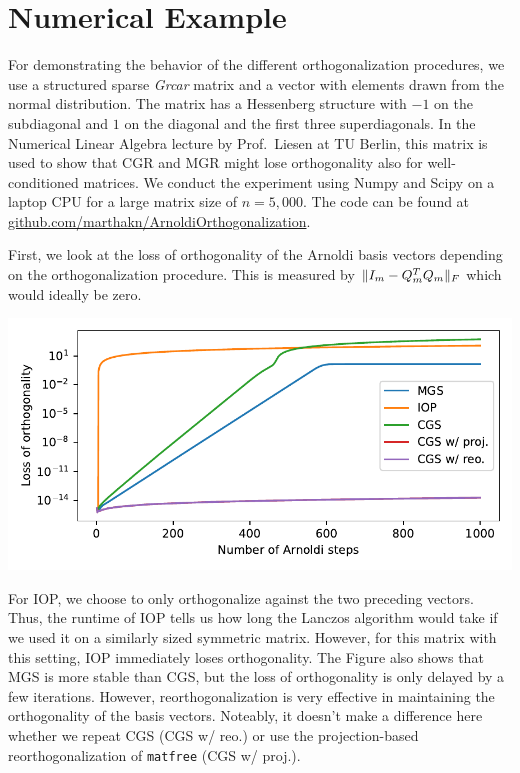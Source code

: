\documentclass[11pt]{article}
\DeclarePairedDelimiter\norm{\lVert}{\rVert}
\begin{document}
\section{Numerical Example}
For demonstrating the behavior of the different orthogonalization procedures, we use a structured sparse \emph{Grcar} matrix and a vector with elements drawn from the normal distribution.
The matrix has a Hessenberg structure with $-1$ on the subdiagonal and $1$ on the diagonal and the first three superdiagonals.
In the Numerical Linear Algebra lecture by Prof.\ Liesen at TU Berlin, this matrix is used to show that CGR and MGR might lose orthogonality also for well-conditioned matrices.
We conduct the experiment using Numpy and Scipy on a laptop CPU for a large matrix size of $n=5,000$.
The code can be found at \url{github.com/marthakn/ArnoldiOrthogonalization}.

First, we look at the loss of orthogonality of the Arnoldi basis vectors depending on the orthogonalization procedure.
This is measured by $\norm{I_m - Q_m^T Q_m}_F$ which would ideally be zero.
\begin{center}
    
    \includegraphics[width=\textwidth]{loss_of_orthogonality_grcar}
\end{center}

For IOP, we choose to only orthogonalize against the two preceding vectors.
Thus, the runtime of IOP tells us how long the Lanczos algorithm would take if we used it on a similarly sized symmetric matrix.
However, for this matrix with this setting, IOP immediately loses orthogonality.
The Figure also shows that MGS is more stable than CGS, but the loss of orthogonality is only delayed by a few iterations.
However, reorthogonalization is very effective in maintaining the orthogonality of the basis vectors.
Noteably, it doesn't make a difference here whether we repeat CGS (\textsf{CGS w/ reo.}) or use the projection-based reorthogonalization of \verb|matfree| (\textsf{CGS w/ proj.}).
\end{document}
